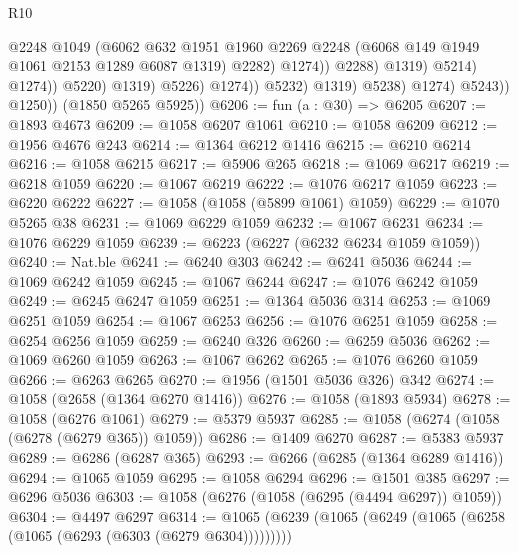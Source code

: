\begin{lexlean}{R10}
\begin{coremodule}
                                              @2248
                                              @1049
                                              (@6062
                                                @632
                                                @1951
                                                @1960
                                                @2269
                                                @2248
                                                (@6068 @149 @1949 @1061 @2153 @1289 @6087 @1319)
                                                @2282)
                                              @1274))
                                          @2288)
                                        @1319)
                                      @5214)
                                    @1274))
                                @5220)
                              @1319)
                            @5226)
                          @1274))
                      @5232)
                    @1319)
                  @5238)
                @1274)
              @5243))
          @1250))
      (@1850 @5265 @5925))
@6206 := fun (a : @30) => @6205
@6207 := @1893 @4673
@6209 := @1058 @6207 @1061
@6210 := @1058 @6209
@6212 := @1956 @4676 @243
@6214 := @1364 @6212 @1416
@6215 := @6210 @6214
@6216 := @1058 @6215
@6217 := @5906 @265
@6218 := @1069 @6217
@6219 := @6218 @1059
@6220 := @1067 @6219
@6222 := @1076 @6217 @1059
@6223 := @6220 @6222
@6227 := @1058 (@1058 (@5899 @1061) @1059)
@6229 := @1070 @5265 @38
@6231 := @1069 @6229 @1059
@6232 := @1067 @6231
@6234 := @1076 @6229 @1059
@6239 := @6223 (@6227 (@6232 @6234 @1059 @1059))
@6240 := Nat.ble
@6241 := @6240 @303
@6242 := @6241 @5036
@6244 := @1069 @6242 @1059
@6245 := @1067 @6244
@6247 := @1076 @6242 @1059
@6249 := @6245 @6247 @1059
@6251 := @1364 @5036 @314
@6253 := @1069 @6251 @1059
@6254 := @1067 @6253
@6256 := @1076 @6251 @1059
@6258 := @6254 @6256 @1059
@6259 := @6240 @326
@6260 := @6259 @5036
@6262 := @1069 @6260 @1059
@6263 := @1067 @6262
@6265 := @1076 @6260 @1059
@6266 := @6263 @6265
@6270 := @1956 (@1501 @5036 @326) @342
@6274 := @1058 (@2658 (@1364 @6270 @1416))
@6276 := @1058 (@1893 @5934)
@6278 := @1058 (@6276 @1061)
@6279 := @5379 @5937
@6285 := @1058 (@6274 (@1058 (@6278 (@6279 @365)) @1059))
@6286 := @1409 @6270
@6287 := @5383 @5937
@6289 := @6286 (@6287 @365)
@6293 := @6266 (@6285 (@1364 @6289 @1416))
@6294 := @1065 @1059
@6295 := @1058 @6294
@6296 := @1501 @385
@6297 := @6296 @5036
@6303 := @1058 (@6276 (@1058 (@6295 (@4494 @6297)) @1059))
@6304 := @4497 @6297
@6314 := @1065 (@6239 (@1065 (@6249 (@1065 (@6258 (@1065 (@6293 (@6303 (@6279 @6304)))))))))

\end{coremodule}
\end{lexlean}
